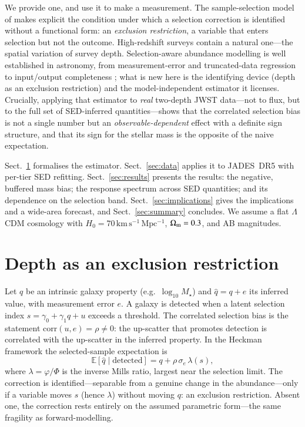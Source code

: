 \documentclass{aa}
\newcommand{\Mst}{M_\star}
\begin{document}
We provide one, and use it to make a measurement. The sample-selection model of
\citet{Heckman1979} makes explicit the condition under which a selection correction is
identified without a functional form: an \emph{exclusion restriction}, a variable that enters
selection but not the outcome. High-redshift surveys contain a natural one---the spatial variation
of survey depth. Selection-aware abundance modelling is well established in astronomy, from
measurement-error and truncated-data regression \citep{Kelly2007,Mantz2019} to input/output
completeness \citep{Leethochawalit2022}; what is new here is the identifying device (depth as an
exclusion restriction) and the model-independent estimator it licenses. Crucially, applying that
estimator to \emph{real} two-depth JWST data---not to flux, but to the full set of SED-inferred
quantities---shows that the correlated selection bias is not a single number but an
\emph{observable-dependent} effect with a definite sign structure, and that its sign for the
stellar mass is the opposite of the naive expectation.

Sect.~\ref{sec:method} formalises the estimator. Sect.~\ref{sec:data} applies it to JADES~DR5
with per-tier SED refitting. Sect.~\ref{sec:results} presents the results: the negative,
buffered mass bias; the response spectrum across SED quantities; and its dependence on the
selection band. Sect.~\ref{sec:implications} gives the implications and a wide-area forecast, and
Sect.~\ref{sec:summary} concludes. We assume a flat $\Lambda$CDM cosmology with
$H_0=70\,\mathrm{km\,s^{-1}\,Mpc^{-1}}$, $\Omega_{\rm m}=0.3$, and AB magnitudes.

\section{Depth as an exclusion restriction}
\label{sec:method}

Let $q$ be an intrinsic galaxy property (e.g.\ $\log_{10}\Mst$) and $\hat q=q+e$ its inferred
value, with measurement error $e$. A galaxy is detected when a latent selection index
$s=\gamma_0+\gamma_1 q+u$ exceeds a threshold. The correlated selection bias is the statement
$\mathrm{corr}(u,e)=\rho\neq0$: the up-scatter that promotes detection is correlated with the
up-scatter in the inferred property. In the Heckman framework the selected-sample expectation is
\begin{equation}
\mathbb{E}[\hat q\mid\text{detected}]=q+\rho\,\sigma_e\,\lambda(s),
\label{eq:heckman}
\end{equation}
where $\lambda=\varphi/\Phi$ is the inverse Mills ratio, largest near the selection limit. The
correction is identified---separable from a genuine change in the abundance---only if a variable
moves $s$ (hence $\lambda$) without moving $q$: an exclusion restriction. Absent one, the
correction rests entirely on the assumed parametric form---the same fragility as forward-modelling.
\end{document}
